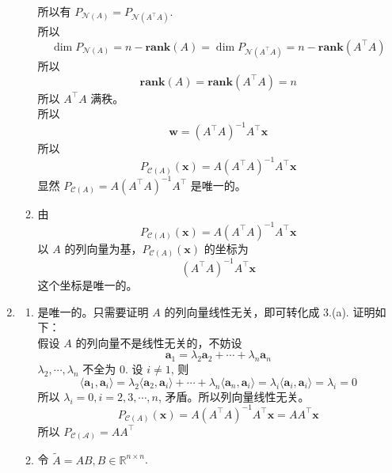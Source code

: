 \documentclass[11pt,letter,notitlepage]{article}
\newcommand{\rank}[1]{ \textbf{rank}  (#1)  }
\begin{document}
\begin{solution}
\begin{enumerate}
\begin{enumerate}
\begin{enumerate}
                        \end{enumerate}
                        所以有 $P_{\mathcal{N}(A)}=P_{\mathcal{N}(A^\top A)}$.\\
                        所以 $$\dim{P_{\mathcal{N}(A)}}=n-\rank{A}
                            =\dim{P_{\mathcal{N}(A^\top A)}}=n-\rank{A^\top A}$$
                        所以 $$\rank{A}=\rank{A^\top A}=n$$
                        所以 $A^\top A$ 满秩。\\
                        所以 $$\mathbf{w}=\left( A^\top A \right)^{-1}A^\top \mathbf{x}$$
                        所以 $$P_{\mathcal{C}(A)}(\mathbf{x})=A \left( A^\top A \right)^{-1}A^\top \mathbf{x}$$
                        显然 $P_{\mathcal{C}(A)}=A \left( A^\top A \right)^{-1}A^\top$ 是唯一的。
                  \item 由 $$P_{\mathcal{C}(A)}(\mathbf{x})=A \left( A^\top A \right)^{-1}A^\top \mathbf{x}$$
                        以 $A$ 的列向量为基，$P_{\mathcal{C}(A)}(\mathbf{x})$ 的坐标为
                        $$\left( A^\top A \right)^{-1}A^\top \mathbf{x}$$
                        这个坐标是唯一的。
              \end{enumerate}
        \item \begin{enumerate}
                  \item 是唯一的。只需要证明 $A$ 的列向量线性无关，即可转化成 3.(a). 证明如下：\\
                        假设 $A$ 的列向量不是线性无关的，不妨设
                        $$\mathbf{a}_1=\lambda_2 \mathbf{a}_2 + \cdots + \lambda_n \mathbf{a}_n$$
                        $\lambda_2, \cdots, \lambda_n$ 不全为 $0$. 设 $i \neq 1$, 则
                        $$\langle \mathbf{a}_1, \mathbf{a}_i \rangle
                            = \lambda_2 \langle \mathbf{a}_2,\mathbf{a}_i \rangle
                            +\cdots
                            +\lambda_n \langle \mathbf{a}_n,\mathbf{a}_i \rangle
                            =\lambda_i\langle \mathbf{a}_i,\mathbf{a}_i \rangle=\lambda_i=0$$
                        所以 $\lambda_i =0 ,i =2,3,\cdots,n$, 矛盾。所以列向量线性无关。
                        $$P_{\mathcal{C}(A)}(\mathbf{x})
                            =A \left( A^\top A \right)^{-1}A^\top \mathbf{x}
                            =A A^\top \mathbf{x}$$
                        所以 $P_{\mathcal{C(A)}}=A A^\top$
                  \item 令 $\widetilde{A}=AB, B\in\mathbb{R}^{n\times n}$. \\

\end{enumerate}
\end{enumerate}
\end{solution}
\end{document}
